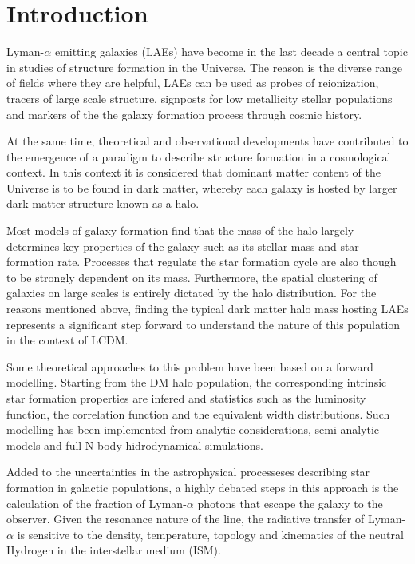 \documentclass[usenatbib]{mn2e}
\begin{document}
\section{Introduction}

Lyman-$\alpha$ emitting galaxies (LAEs) have become in the last decade a 
central topic in studies of structure formation in the Universe. The
reason is the diverse range of fields where they are helpful, LAEs can
be used as probes of reionization, tracers of large scale structure,
signposts for low metallicity stellar populations and markers of the
the galaxy formation process through cosmic history.  


At the same time, theoretical and observational developments have
contributed to the emergence of a paradigm to describe structure
formation in a cosmological context. In this context it is considered
that dominant matter content of the Universe is to be found in dark
matter, whereby each galaxy is hosted by larger dark matter structure
known as a halo. 

Most models of galaxy formation find that the mass of the halo largely
determines key properties of the galaxy such as its stellar mass and
star formation rate. Processes that regulate the star formation cycle
are also though to be strongly dependent on its mass. Furthermore, the
spatial clustering of galaxies on large scales is entirely dictated by
the halo distribution.  For the reasons mentioned above, finding the
typical dark matter halo mass hosting LAEs represents a significant
step forward to understand the nature of this population in the
context of LCDM.  

Some theoretical approaches to this problem have been based on a
forward modelling. Starting from the DM halo population, the
corresponding intrinsic star formation properties are infered and
statistics such as the luminosity function, the correlation function
and the equivalent width distributions. Such modelling has been
implemented from analytic considerations, semi-analytic models and
full N-body hidrodynamical simulations. 

Added to the uncertainties in the astrophysical processeses describing
star formation in galactic populations, a highly debated steps in this
approach is the calculation of the fraction of Lyman-$\alpha$ photons
that escape the galaxy to the observer. Given the resonance nature of
the line, the radiative transfer of Lyman-$\alpha$ is sensitive to the
density, temperature, topology and kinematics of the neutral Hydrogen
in the interstellar medium (ISM).  
\end{document}
